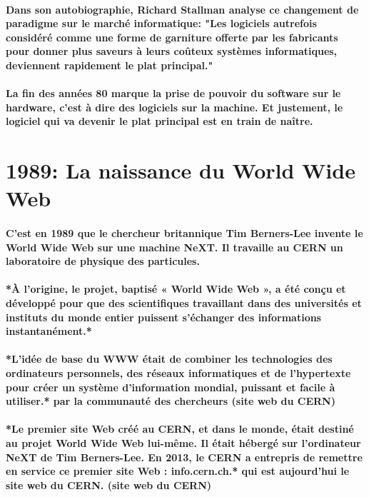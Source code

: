 \paragraph{
  Dans son autobiographie, Richard Stallman analyse ce changement de paradigme sur le marché informatique: "Les logiciels autrefois considéré comme une forme de garniture offerte par les fabricants pour donner plus saveurs à leurs coûteux systèmes informatiques, deviennent rapidement le plat principal."
}

\paragraph{
  La fin des années 80 marque la prise de pouvoir du software sur le hardware, c'est à dire des logiciels sur la machine. Et justement, le logiciel qui va devenir le plat principal est en train de naître.
}

\section*{1989: La naissance du World Wide Web}

\paragraph{
  C'est en 1989 que le chercheur britannique Tim Berners-Lee invente le World Wide Web sur une machine NeXT. Il travaille au CERN un laboratoire de physique des particules.
}

\paragraph{
  *À l’origine, le projet, baptisé « World Wide Web », a été conçu et développé pour que des scientifiques travaillant dans des universités et instituts du monde entier puissent s'échanger des informations instantanément.*
}

\paragraph{
  *L'idée de base du WWW était de combiner les technologies des ordinateurs personnels, des réseaux informatiques et de l'hypertexte pour créer un système d'information mondial, puissant et facile à utiliser.* par la communauté des chercheurs (site web du CERN)
}

\paragraph{
  *Le premier site Web créé au CERN, et dans le monde, était destiné au projet World Wide Web lui-même. Il était hébergé sur l’ordinateur NeXT de Tim Berners-Lee. En 2013, le CERN a entrepris de remettre en service ce premier site Web : info.cern.ch.* qui est aujourd'hui le site web du CERN. (site web du CERN)
}

